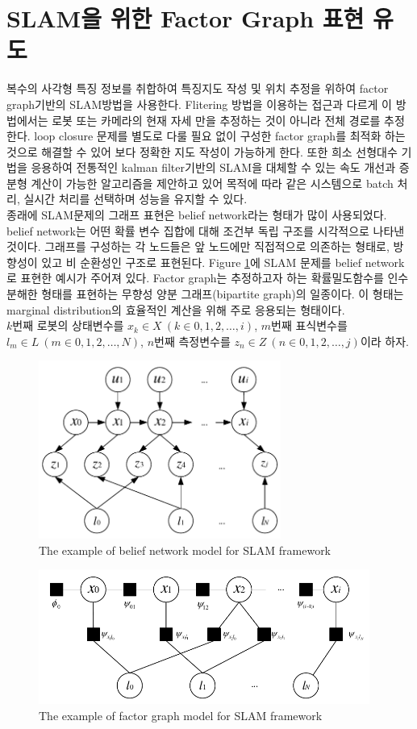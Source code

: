 \documentclass[master,korean,final]{cbnu-ecs}
\begin{document}
\section{SLAM을 위한 Factor Graph 표현 유도}
복수의 사각형 특징 정보를 취합하여 특징지도 작성 및 위치 추정을 위하여 factor graph기반의 SLAM방법\cite{Dellaert2006}을 사용한다. Flitering 방법을 이용하는 접근과 다르게 이 방법에서는 로봇 또는 카메라의 현재 자세 만을 추정하는 것이 아니라 전체 경로를 추정한다. loop closure 문제를 별도로 다룰 필요 없이 구성한 factor graph를 최적화 하는 것으로 해결할 수 있어 보다 정확한 지도 작성이 가능하게 한다. 또한 희소 선형대수 기법을 응용하여 전통적인 kalman filter기반의 SLAM을 대체할 수 있는 속도 개선과 증분형 계산이 가능한 알고리즘을 제안하고 있어 목적에 따라 같은 시스템으로 batch 처리, 실시간 처리를 선택하며 성능을 유지할 수 있다\cite{Kaess2007, Kaess2011}.\\
종래에 SLAM문제의 그래프 표현은 belief network라는 형태가 많이 사용되었다. belief network는 어떤 확률 변수 집합에 대해 조건부 독립 구조를 시각적으로 나타낸 것이다. 그래프를 구성하는 각 노드들은 앞 노드에만 직접적으로 의존하는 형태로, 방향성이 있고 비 순환성인 구조로 표현된다. Figure \ref{belief_network}에 SLAM 문제를 belief network로 표현한 예시가 주어져 있다. Factor graph는 추정하고자 하는 확률밀도함수를 인수분해한 형태를 표현하는 무향성 양분 그래프(bipartite graph)의 일종이다. 이 형태는 marginal distribution의 효율적인 계산을 위해 주로 응용되는 형태이다. \\
$k$번째 로봇의 상태변수를 $x_k\in X \ (k\in{0,1,2,\dots,i})$, $m$번째 표식변수를 $l_m\in L \ (m\in{0,1,2,\dots,N})$, $n$번째 측정변수를 $z_n\in Z \ (n\in{0,1,2,\dots,j})$이라 하자. 
\newpage
\begin{figure}[!ht]
  \centering
	\includegraphics[width=300px]{img/beliefnetwork_cropped.pdf}
  \caption{The example of belief network model for SLAM framework}
\label{belief_network}
\end{figure}

\begin{figure}[!ht]
  \centering
	\includegraphics[width=410px]{img/factorgraph_cropped.pdf}
  \caption{The example of factor graph model for SLAM framework}
\label{factorgraph_diagram}
\end{figure}
\newpage
\end{document}
